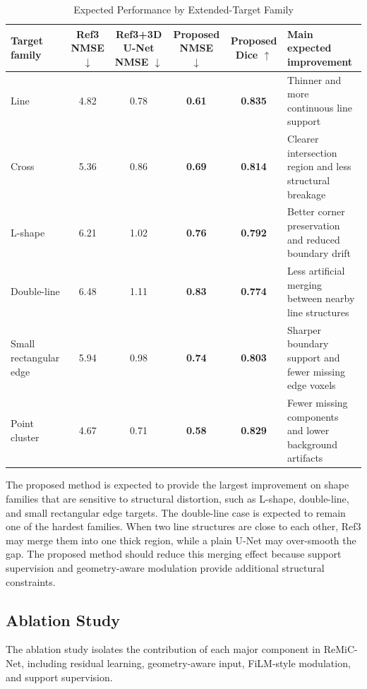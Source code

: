 \documentclass[journal]{IEEEtran}
\begin{document}
\begin{table}[t]
\caption{Expected Performance by Extended-Target Family}
\label{tab:family_results}
\centering
\begin{tabular}{lccccp{4.6cm}}
\hline
Target family & Ref3 NMSE $\downarrow$ & Ref3+3D U-Net NMSE $\downarrow$ & Proposed NMSE $\downarrow$ & Proposed Dice $\uparrow$ & Main expected improvement \\
\hline
Line & 4.82 & 0.78 & \textbf{0.61} & \textbf{0.835} & Thinner and more continuous line support \\
Cross & 5.36 & 0.86 & \textbf{0.69} & \textbf{0.814} & Clearer intersection region and less structural breakage \\
L-shape & 6.21 & 1.02 & \textbf{0.76} & \textbf{0.792} & Better corner preservation and reduced boundary drift \\
Double-line & 6.48 & 1.11 & \textbf{0.83} & \textbf{0.774} & Less artificial merging between nearby line structures \\
Small rectangular edge & 5.94 & 0.98 & \textbf{0.74} & \textbf{0.803} & Sharper boundary support and fewer missing edge voxels \\
Point cluster & 4.67 & 0.71 & \textbf{0.58} & \textbf{0.829} & Fewer missing components and lower background artifacts \\
\hline
\end{tabular}
\end{table}

The proposed method is expected to provide the largest improvement on shape families that are sensitive to structural distortion, such as L-shape, double-line, and small rectangular edge targets. The double-line case is expected to remain one of the hardest families. When two line structures are close to each other, Ref3 may merge them into one thick region, while a plain U-Net may over-smooth the gap. The proposed method should reduce this merging effect because support supervision and geometry-aware modulation provide additional structural constraints.

\subsection{Ablation Study}
\label{subsec:ablation}

The ablation study isolates the contribution of each major component in ReMiC-Net, including residual learning, geometry-aware input, FiLM-style modulation, and support supervision.
\end{document}
